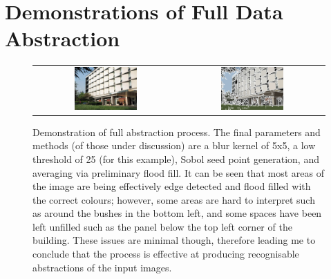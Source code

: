 \chapter{Demonstrations of Full Data Abstraction}
\label{Appendix:demo}

\begin{figure}[h]
    \begin{center}
    \begin{tabular}{ c c }
        \includegraphics[width=0.45\textwidth]{Figures/building.jpg} &
        \includegraphics[width=0.45\textwidth]{Figures/Final.jpg} \\
    \end{tabular}
    \caption[Demonstration of full abstraction process]{Demonstration of full abstraction process. The final parameters and methods (of those under discussion) are a blur kernel of 5x5, a low threshold of 25 (for this example), Sobol seed point generation, and averaging via preliminary flood fill. It can be seen that most areas of the image are being effectively edge detected and flood filled with the correct colours; however, some areas are hard to interpret such as around the bushes in the bottom left, and some spaces have been left unfilled such as the panel below the top left corner of the building. These issues are minimal though, therefore leading me to conclude that the process is effective at producing recognisable abstractions of the input images.}
    \label{fig:Final}
    \end{center}
\end{figure}
        

